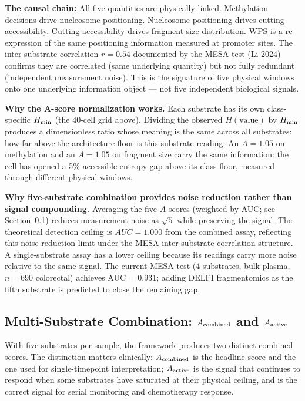 \documentclass[12pt,a4paper]{article}
\begin{document}
\textbf{The causal chain:} All five quantities are physically linked.
Methylation decisions drive nucleosome positioning. Nucleosome positioning
drives cutting accessibility. Cutting accessibility drives fragment size
distribution. WPS is a re-expression of the same positioning information
measured at promoter sites. The inter-substrate correlation $r = 0.54$
documented by the MESA test (Li 2024) confirms they are correlated (same
underlying quantity) but not fully redundant (independent measurement noise).
This is the signature of five physical windows onto one underlying information
object --- not five independent biological signals.

\textbf{Why the A-score normalization works.} Each substrate has its own
class-specific $H_{\rm min}$ (the 40-cell grid above). Dividing the observed
$H(\text{value})$ by $H_{\rm min}$ produces a dimensionless ratio whose meaning
is the same across all substrates: how far above the architecture floor is this
substrate reading. An $A = 1.05$ on methylation and an $A = 1.05$ on fragment
size carry the same information: the cell has opened a 5\% accessible entropy
gap above its class floor, measured through different physical windows.

\textbf{Why five-substrate combination provides noise reduction rather than
signal compounding.} Averaging the five $A$-scores (weighted by AUC; see
Section~\ref{subsec:combination}) reduces measurement noise as $\sqrt{5}$ while
preserving the signal. The theoretical detection ceiling is $AUC = 1.000$ from
the combined assay, reflecting this noise-reduction limit under the MESA
inter-substrate correlation structure. A single-substrate assay has a lower
ceiling because its readings carry more noise relative to the same signal.
The current MESA test (4 substrates, bulk plasma, $n = 690$ colorectal)
achieves AUC = 0.931; adding DELFI fragmentomics as the fifth substrate is
predicted to close the remaining gap.

\subsection{Multi-Substrate Combination: $A_{\rm combined}$ and $A_{\rm active}$}
\label{subsec:combination}

With five substrates per sample, the framework produces two distinct combined
scores. The distinction matters clinically: $A_{\rm combined}$ is the headline
score and the one used for single-timepoint interpretation;
$A_{\rm active}$ is the signal that continues to respond when some substrates
have saturated at their physical ceiling, and is the correct signal for
serial monitoring and chemotherapy response.
\end{document}
